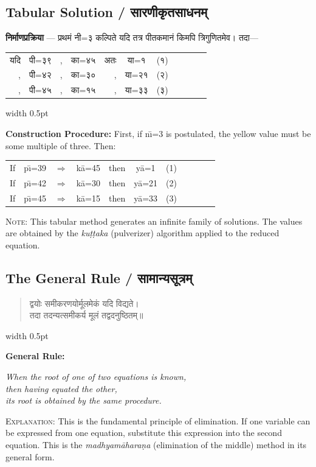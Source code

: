 \documentclass[11pt,a4paper]{article}
\newcommand{\dev}[1]{{\devanagarifont #1}}
\newenvironment{sanskritverse}{%
  \begin{quote}\devanagarifont\textcolor{versecolor}%
}{%
  \end{quote}
}
\newcommand{\bilingual}[2]{%
  \par\vspace{0.5em}%
  \noindent\begin{minipage}[t]{0.47\textwidth}%
  \setlength{\parindent}{0pt}%
  \small #1%
  \end{minipage}%
  \hfill\textcolor{columnrule}{\vrule width 0.5pt}\hfill%
  \begin{minipage}[t]{0.47\textwidth}%
  \setlength{\parindent}{0pt}%
  \small\raggedright #2%
  \end{minipage}%
  \par\vspace{0.5em}%
}
\begin{document}
{\subsection*{Tabular Solution / सारणीकृतसाधनम्}

\bilingual{\textbf{निर्माणप्रक्रिया} — प्रथमं नी=३ कल्पिते यदि तत्र पीतकमानं किमपि त्रिगुणितमेव। तदा—
\begin{center}
\begin{tabular}{rclcrclcrcl}
\dev{यदि} & \dev{पी=३९} & \dev{,} & \dev{का=४५} & \dev{अतः} & \dev{या=१} & \dev{(१)} \\
\dev{,} & \dev{पी=४२} & \dev{,} & \dev{का=३०} & \dev{,} & \dev{या=२१} & \dev{(२)} \\
\dev{,} & \dev{पी=४५} & \dev{,} & \dev{का=१५} & \dev{,} & \dev{या=३३} & \dev{(३)} \\
\end{tabular}
\end{center}
}{%
\textbf{Construction Procedure:} First, if n\={\i}=3 is postulated, the yellow value must be some multiple of three. Then:
\begin{center}
\begin{tabular}{rclcrclcrcl}
If & p\={\i}=39 & $\Rightarrow$ & k\={a}=45 & then & y\={a}=1 & (1)\\
If & p\={\i}=42 & $\Rightarrow$ & k\={a}=30 & then & y\={a}=21 & (2)\\
If & p\={\i}=45 & $\Rightarrow$ & k\={a}=15 & then & y\={a}=33 & (3)\\
\end{tabular}
\end{center}
\textsc{Note:} This tabular method generates an infinite family of solutions. The values are obtained by the \textit{ku\d{t}\d{t}aka} (pulverizer) algorithm applied to the reduced equation.}

\newpage

\subsection*{The General Rule / सामान्यसूत्रम्}

\bilingual{\begin{sanskritverse}
द्वयोः समीकरणयोर्मूलमेकं यदि विद्यते।\\
तदा तदन्यत्समीकर्य मूलं तद्वदनुष्ठितम्॥
\end{sanskritverse}
}{%
\textbf{General Rule:}
\begin{flushright}
\textit{When the root of one of two equations is known,}\\
\textit{then having equated the other,}\\
\textit{its root is obtained by the same procedure.}
\end{flushright}
\textsc{Explanation:} This is the fundamental principle of elimination. If one variable can be expressed from one equation, substitute this expression into the second equation. This is the \textit{madhyam\={a}hara\d{n}a} (elimination of the middle) method in its general form.}

}
\end{document}
